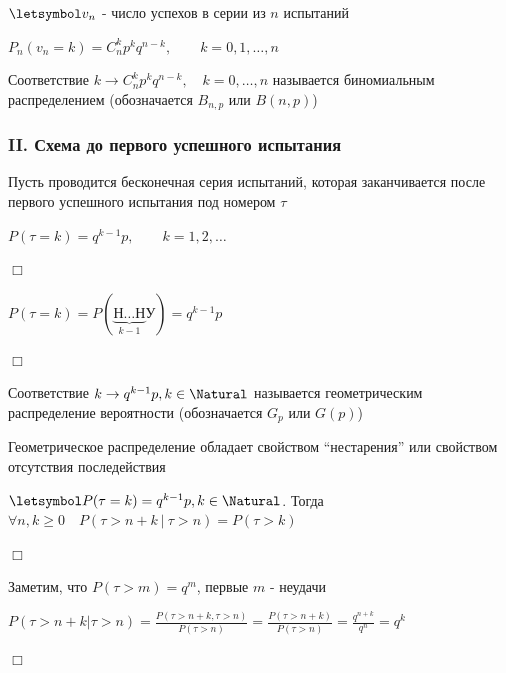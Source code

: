 \documentclass[12pt]{article}
\begin{document}
    $\letsymbol v_n$ - число успехов в серии из $n$ испытаний

    $P_n(v_n = k) = C^k_n p^k q^{n - k}, \quad\quad k = 0, 1, \dots, n$

    \hypertarget{binomialdistribution}{}

    \Def Соответствие $k \rightarrow C^k_n p^k q^{n - k}, \quad k = 0, \dots, n$ называется биномиальным распределением
    (обозначается $B_{n,p}$ или $B(n, p)$)

    \hypertarget{untilfirstsuccessschema}{}

    \subsubsection{II. Схема до первого успешного испытания}

    Пусть проводится бесконечная серия испытаний, которая заканчивается после первого успешного испытания
    под номером $\tau$

    \begin{MyTheorem}
        \Ths $P(\tau = k) = q^{k - 1} p, \quad\quad k = 1, 2, \dots$
    \end{MyTheorem}

    \begin{MyProof}
        $\Box$

        $P(\tau = k) = P(\underset{k - 1}{\underbrace{\text{Н}\dots\text{Н}}}\text{У}) = q^{k - 1}p$

        $\Box$
    \end{MyProof}

    \hypertarget{geometricdistribution}{}

    \Def Соответствие $k \rightarrow q^{k - 1} p, k \in \Natural$ называется геометрическим
    распределение вероятности (обозначается $G_p$ или $G(p)$)

    \Nota Геометрическое распределение обладает свойством \enquote{нестарения} или свойством отсутствия
    последействия

    \begin{MyTheorem}
        \Ths $\letsymbol P(\tau = k) = q^{k - 1} p, k \in \Natural$. Тогда $\forall n, k \geq 0 \quad P(\tau > n + k \ | \ \tau > n) = P(\tau > k)$
    \end{MyTheorem}

    \begin{MyProof}
        $\Box$

        Заметим, что $P(\tau > m) = q^m$, первые $m$ - неудачи

        $P(\tau > n + k | \tau > n) = \frac{P(\tau > n + k, \tau > n)}{P(\tau > n)} = \frac{P(\tau > n + k)}{P(\tau > n)} = \frac{q^{n + k}}{q^n} = q^k$

        $\Box$
    \end{MyProof}
\end{document}
